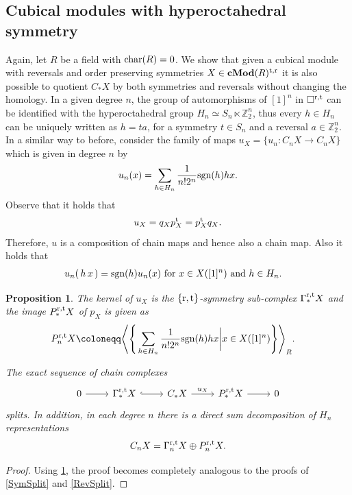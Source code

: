 \documentclass[12pt]{amsart}
\theoremstyle{plain}
\numberwithin{lemma}{\DefaultNumberTheoremWithin}
\numberwithin{claim}{\DefaultNumberTheoremWithin}
\numberwithin{theorem}{\DefaultNumberTheoremWithin}
\numberwithin{corollary}{\DefaultNumberTheoremWithin}
\newtheorem{proposition}{Proposition}
\numberwithin{proposition}{\DefaultNumberTheoremWithin}
\numberwithin{conjecture}{\DefaultNumberTheoremWithin}
\theoremstyle{definition}
\theoremstyle{definition}
\numberwithin{question}{\DefaultNumberTheoremWithin}
\theoremstyle{definition}
\numberwithin{problem}{\DefaultNumberTheoremWithin}
\theoremstyle{remark}
\numberwithin{remark}{\DefaultNumberTheoremWithin}
\theoremstyle{remark}
\numberwithin{example}{\DefaultNumberTheoremWithin}
\def\blt{*}
\def\one{[1]}
\def\kk{{R}}
\def\letbe{\coloneqq}
\def\sgn{\textnormal{sgn}}
\def\ZZ{\mathbb Z}
\def\rev{\textnormal{r}}
\def\trp{\textnormal{t}}
\def\pirev{q}
\def\Con{\mathrm{\Gamma}}  %
\def\rtCon{\Con^{\rev,\trp}} %
\newcommand{\ptr}[1]{u_{#1}}
\def\pitr{u}
\begin{document}
\subsection{Cubical modules with hyperoctahedral symmetry}\label{sub:hyperoctahedral}
Again, let $R$ be a field with $\textnormal{char}(R)= 0$. We show that given a cubical module with reversals and order preserving symmetries $X\in \mathbf{cMod}(R)^{\trp,\rev}$ it is also possible to quotient $C_\blt X$ by both symmetries and reversals without changing the homology. 
In a given degree $n$, the group of automorphisms of $[1]^n$ in $\square^{\rev,\trp}$ can be identified with the hyperoctahedral group $H_n\simeq S_n \ltimes\ZZ_2^n$, thus every $h\in H_n$ can be uniquely written as $h=t a$, for a symmetry $t\in S_n$ and a reversal $a \in \ZZ_2^n$.  
In a similar way to before, consider the family of maps
$\pitr_X=\{\ptr{n}\colon C_n X \to C_n X\}$ which is given in degree $n$ by
\[
\ptr{n}(x)=\sum_{h\in H_n}\frac{1}{n!2^n}\sgn(h)hx.
\]
Observe that it holds that
\[
\pitr_X=\pirev_X p^{\trp}_X=p^{\trp}_X\pirev_X.
\]
Therefore, $\pitr$ is a composition of chain maps and hence also a chain map. Also it holds that
\begin{align} \label{eq:equivboth}  
  \ptr{n}(\,h\,x\,) & = \sgn(h) \ptr{n}(x) \text{ for } x \in X(\one^n) \text{ and } h \in H_n. 
\end{align}
\begin{proposition}\label{BothSplit}
The kernel of $\pitr_X$ is the $\{\rev,\trp\}$-symmetry sub-complex $\rtCon_\blt X$ and the image $P^{\rev,\trp}_\blt X$ of $p_X$ is given as 
\begin{align*}
      P_n^{\rev,\trp} X\letbe&\Bigg\langle \Bigg\{ \sum_{h\in H_n}\frac{1}{n!2^n}\sgn(h)hx \bigg\vert x\in X([1]^n)\Bigg \} \Bigg\rangle_{\kk}.
\end{align*}

The exact sequence of chain complexes
  \[
   \begin{tikzcd}
    0\arrow{r}{}&\rtCon_\blt X\arrow[hook]{r}{} &C_\blt X\arrow{r}{\pitr_X}&P^{\rev,\trp}_\blt X \arrow{r}&0
    \end{tikzcd}
\]
splits. In addition, in each degree $n$ there is a direct sum decomposition of $H_{n}$ representations
\begin{align*}
C_n X=\rtCon_n X\oplus P^{\rev,\trp}_n X.
\end{align*}
\end{proposition}
\begin{proof}
    Using \ref{BothSplit}, the proof becomes completely analogous to the proofs of \ref{SymSplit} and \ref{RevSplit}.
\end{proof}
\end{document}
